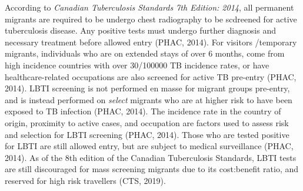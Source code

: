 \documentclass[sn-mathphys,Numbered]{sn-jnl}%
\theoremstyle{thmstyleone}%
\theoremstyle{thmstyletwo}%
\theoremstyle{thmstylethree}%
\begin{document}
     According to \textit{Canadian Tuberculosis Standards 7th Edition: 2014}, all permanent migrants %
     are required to be undergo chest radiography to be scdreened for active tuberculosis disease. Any positive tests must undergo further diagnosis and necessary treatment before allowed entry (PHAC, 2014). For visitors /temporary migrants, individuals who are on extended stays of over 6 months, come from high incidence countries with over 30/100000 TB incidence rates, or have healthcare-related occupations are also screened for active TB pre-entry (PHAC, 2014). LBTI screening is not performed en masse for migrant groups pre-entry, and is instead performed on \textit{select} migrants who are at higher risk to have been exposed to TB infection (PHAC, 2014). The incidence rate in the country of origin, proximity to active cases, and occupation are factors used to assess risk and selection for LBTI screening (PHAC, 2014). Those who are tested positive for LBTI are still allowed entry, but are subject to medical surveillance (PHAC, 2014). As of the 8th edition of the Canadian Tuberculosis Standards, LBTI tests are still discouraged for mass screening migrants due to its cost:benefit ratio, and reserved for high risk travellers (CTS, 2019).

    
     
\end{document}
